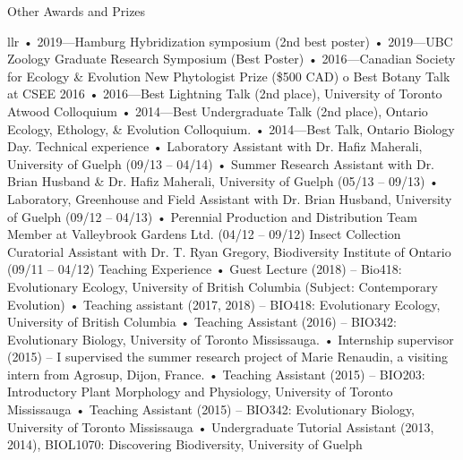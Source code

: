 \documentclass[12pt]{article}
\begin{document}
Other Awards and Prizes 
\begin{tabular}{llr}
•	2019—Hamburg Hybridization symposium (2nd best poster)
•	2019—UBC Zoology Graduate Research Symposium (Best Poster)
•	2016—Canadian Society for Ecology & Evolution New Phytologist Prize (\$500 CAD)
o	Best Botany Talk at CSEE 2016
•	2016—Best Lightning Talk (2nd place), University of Toronto Atwood Colloquium
•	2014—Best Undergraduate Talk (2nd place), Ontario Ecology, Ethology, & Evolution Colloquium.
•	2014—Best Talk, Ontario Biology Day.
Technical experience
•	Laboratory Assistant with Dr. Hafiz Maherali, University of Guelph (09/13 – 04/14)
•	Summer Research Assistant with Dr. Brian Husband & Dr. Hafiz Maherali, University of Guelph (05/13 – 09/13)
•	Laboratory, Greenhouse and Field Assistant with Dr. Brian Husband, University of Guelph (09/12 – 04/13)
•	Perennial Production and Distribution Team Member at Valleybrook Gardens Ltd. (04/12 – 09/12)	
Insect Collection Curatorial Assistant with Dr. T. Ryan Gregory, Biodiversity Institute of Ontario (09/11 – 04/12)
Teaching Experience
•	Guest Lecture (2018) – Bio418: Evolutionary Ecology, University of British Columbia (Subject: Contemporary Evolution)
•	Teaching assistant (2017, 2018) – BIO418: Evolutionary Ecology, University of British Columbia
•	Teaching Assistant (2016) – BIO342: Evolutionary Biology, University of Toronto Mississauga. 
•	Internship supervisor (2015) – I supervised the summer research project of Marie Renaudin, a visiting intern from Agrosup, Dijon, France.
•	Teaching Assistant (2015) – BIO203: Introductory Plant Morphology and Physiology, University of Toronto Mississauga
•	Teaching Assistant (2015) – BIO342: Evolutionary Biology, University of Toronto Mississauga
•	Undergraduate Tutorial Assistant (2013, 2014), BIOL1070: Discovering Biodiversity, University of Guelph
\end{tabular}
\end{document}

